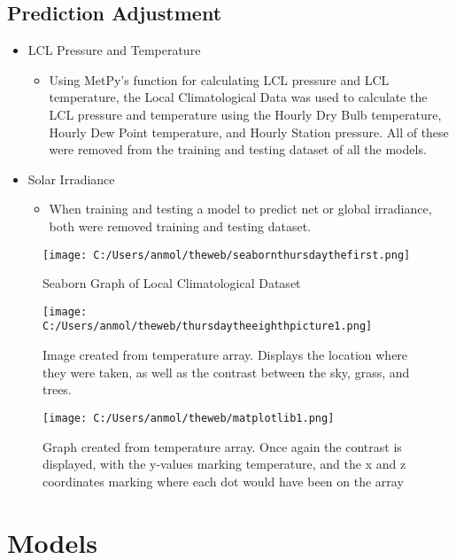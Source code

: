 \documentclass[conference]{IEEEtran}
\begin{document}
\subsection{Prediction Adjustment}
\begin{itemize}
\item LCL Pressure and Temperature
\begin{itemize}
\item Using MetPy's function for calculating LCL pressure and LCL temperature, the Local Climatological Data was used to calculate the LCL pressure and temperature using the
Hourly Dry Bulb temperature, Hourly Dew Point temperature, and Hourly Station pressure. All of these were removed from the training and testing dataset of all the models.
\end{itemize}
\end{itemize}
\begin{itemize}
\item Solar Irradiance
\begin{itemize}
\item When training and testing a model to predict net or global irradiance, both were removed training and testing dataset.
\end{itemize}
\end{itemize}

\begin{figure}[htbp]
\centerline{\texttt{[image: C:/Users/anmol/theweb/seabornthursdaythefirst.png]}}
\caption{Seaborn Graph of Local Climatological Dataset}
\label{fig}
\end{figure}

\begin{figure}[htbp]
\centerline{\texttt{[image: C:/Users/anmol/theweb/thursdaytheeighthpicture1.png]}}
\caption{Image created from temperature array. Displays the location where they were taken, as well as the contrast between the sky, grass, and trees.}
\label{fig}
\end{figure}
\begin{figure}[htbp]
\centerline{\texttt{[image: C:/Users/anmol/theweb/matplotlib1.png]}}
\caption{Graph created from temperature array. Once again the contrast is displayed, with the y-values marking temperature, and the x and z coordinates marking where each dot would have been on the array}
\label{fig}
\end{figure}
\section{Models}
\end{document}

